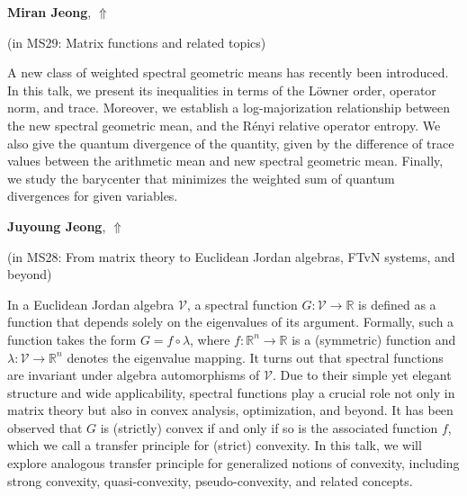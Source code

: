 \documentclass[ILAS2025-program.tex]{subfiles}
\begin{document}
\hypertarget{down0123}{}\begin{ilasabstract}
    
\textbf{Miran Jeong},  \hfill \hyperlink{up0123}{$\Uparrow$}
    
    
(in {\color{mstitle}MS29: Matrix functions and related topics})
        
\mtskip
    A new class of weighted spectral geometric means has recently been introduced. In this talk, we present its inequalities in terms of the L\"{o}wner order, operator
norm, and trace.
Moreover, we establish a log-majorization relationship between the new spectral geometric mean, and the R\'{e}nyi relative operator entropy.
We also give the quantum divergence of the quantity, given by the difference of trace values between the
arithmetic mean and new spectral geometric mean.
Finally, we study the barycenter that minimizes the weighted sum of quantum divergences for given variables.

\end{ilasabstract}
    

\hypertarget{down0383}{}\begin{ilasabstract}
    
\textbf{Juyoung Jeong},  \hfill \hyperlink{up0383}{$\Uparrow$}
    
    
(in {\color{mstitle}MS28: From matrix theory to Euclidean Jordan algebras, FTvN systems, and beyond})
        
\mtskip
    In a Euclidean Jordan algebra $\mathcal{V}$, a spectral function $G : \mathcal{V} \to \mathbb{R}$ is defined as a function that depends solely on the eigenvalues of its argument. Formally, such a function takes the form $G = f \circ \lambda$, where $f : \mathbb{R}^n \to \mathbb{R}$ is a (symmetric) function and $\lambda : \mathcal{V} \to \mathbb{R}^n$ denotes the eigenvalue mapping. It turns out that spectral functions are invariant under algebra automorphisms of $\mathcal{V}$.
Due to their simple yet elegant structure and wide applicability, spectral functions play a crucial role not only in matrix theory but also in convex analysis, optimization, and beyond. It has been observed that $G$ is (strictly) convex if and only if so is the associated function $f$, which we call a transfer principle for (strict) convexity. In this talk, we will explore analogous transfer principle for generalized notions of convexity, including strong convexity, quasi-convexity, pseudo-convexity, and related concepts. 

\end{ilasabstract}
    
\end{document}
